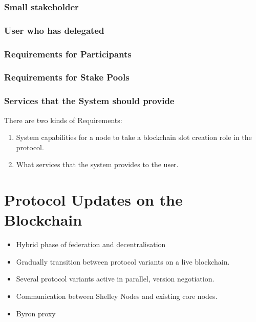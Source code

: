 \documentclass{report}
\theoremstyle{definition}{
  \newtheorem{lemma}{Lemma}[section] %
  \newtheorem{definition}[lemma]{Definition}
}
\theoremstyle{theorem}{
  \newtheorem{invariant}[lemma]{Invariant}
  \newtheorem{proofobligation}[lemma]{Proof Obligation}
}
\numberwithin{equation}{lemma}
\begin{document}
\subsubsection{Small stakeholder}
\subsubsection{User who has delegated}
\subsubsection{Requirements for Participants}
\subsubsection{Requirements for Stake Pools}
\subsubsection{Services that the System should provide}

There are two kinds of Requirements:

\begin{enumerate}
\item System capabilities for a node to take a blockchain slot creation role in the protocol.
\item What services that the system provides to the user.
\end{enumerate}



\section{Protocol Updates on the Blockchain}
\begin{itemize}
\item Hybrid phase of federation and decentralisation
\item Gradually transition between protocol variants on a live blockchain.
\item Several protocol variants active in parallel, version negotiation.
\item Communication between Shelley Nodes and existing core nodes.
\item Byron proxy
\end{itemize}
\end{document}
